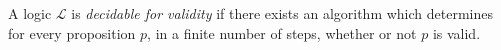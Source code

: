A logic $\mathcal{L}$ is \emph{decidable for validity} if there exists an algorithm which determines for every proposition $p$, in a finite number of steps, whether or not $p$ is valid.
